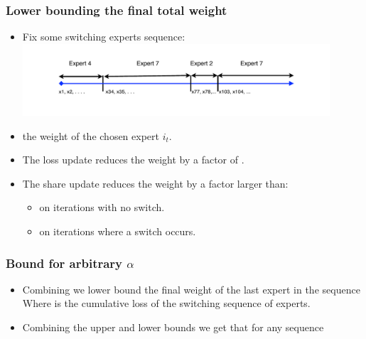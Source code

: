 \documentclass[handout]{beamer}
\begin{document}
\begin{frame}
\frametitle{Lower bounding the final total weight}
\begin{itemize}
\item Fix some switching experts sequence:
\includegraphics[width=4.5in]{figures/SwitchingExperts.pdf}
\item {} the weight of the chosen expert $i_t$.
\item The loss update reduces the weight by a factor of .
\item The share update reduces the weight by a factor larger than:
\begin{itemize}
\item {} on iterations with no switch.
\item {} on iterations where a switch occurs.
\end{itemize}
\end{itemize}
\end{frame}

\begin{frame}
\frametitle{Bound for arbitrary $\alpha$}
\begin{itemize}
\item
Combining we lower bound the final weight of the last expert in the sequence
Where  is the cumulative loss of the switching sequence of experts.
\item
Combining the upper and lower bounds we get that for any sequence 
\end{itemize}
\end{frame}
\end{document}
